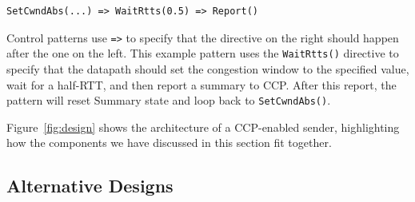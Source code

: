\begin{verbatim}
SetCwndAbs(...) => WaitRtts(0.5) => Report()
\end{verbatim}
 
Control patterns use \texttt{=>} to specify that the directive on the right should happen after the one on the left. This example pattern uses the \texttt{WaitRtts()} directive to specify that the datapath should set the congestion window to the specified value, wait for a half-RTT, and then report a summary to CCP. After this report, the pattern will reset Summary state and loop back to \texttt{SetCwndAbs()}.
 
 
Figure~\ref{fig:design} shows the architecture of a CCP-enabled sender, highlighting how the components we have discussed in this section fit together. 



\subsection{Alternative Designs}
\label{sec:design:alternatives}




